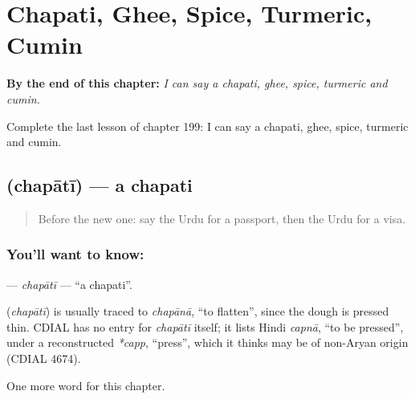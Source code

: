 
\chapter{Chapati, Ghee, Spice, Turmeric, Cumin}
\label{ch:ur-chapati-ghee-spice-turmeric-cumin}

\begin{chapteropening}
\textbf{By the end of this chapter:} \emph{I can say a chapati, ghee, spice, turmeric and cumin.}

Complete the last lesson of chapter 199: I can say a chapati, ghee, spice, turmeric and cumin.
\end{chapteropening}

\section[\texorpdfstring{\ur{چپاتی} (chapātī)}{چپاتی (chapātī)}]{ (chapātī) — a chapati}

\label{lesson:UR-C199-chapati}



\begin{quote}
Before the new one: say the Urdu for a passport, then the Urdu for a visa.
\end{quote}

\subsection*{You'll want to know: }
\textbf{} — \emph{chapātī} — \textquotedblleft{}a chapati\textquotedblright{}.

\begin{cousinweb}
\textbf{} (\emph{chapātī}) is usually traced to \emph{chapānā}, \textquotedblleft{}to flatten\textquotedblright{}, since the dough is pressed thin. CDIAL has no entry for \emph{chapātī} itself; it lists Hindi \emph{capnā}, \textquotedblleft{}to be pressed\textquotedblright{}, under a reconstructed \emph{*capp}, \textquotedblleft{}press\textquotedblright{}, which it thinks may be of non-Aryan origin (CDIAL 4674).
\end{cousinweb}

\begin{grammarlens}[title={What you've built}]
One more word for this chapter.
\end{grammarlens}

